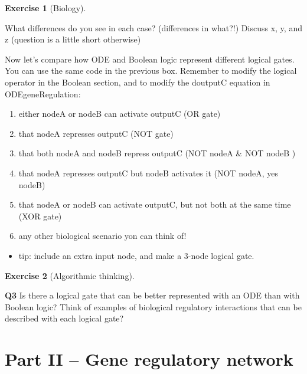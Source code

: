 \documentclass[
  letterpaper,
  DIV=11,
  numbers=noendperiod]{scrreprt}
\providecommand{\tightlist}{%
  \setlength{\itemsep}{0pt}\setlength{\parskip}{0pt}}\usepackage{longtable,booktabs,array}
\theoremstyle{definition}
\newtheorem{exercise}{Exercise}[chapter]
\theoremstyle{remark}
\begin{document}
\begin{exercise}[Biology]\protect\hypertarget{exr-non}{}\label{exr-non}

What differences do you see in each case? (differences in what?!)
Discuss x, y, and z (question is a little short otherwise)

\end{exercise}

Now let's compare how ODE and Boolean logic represent different logical
gates. You can use the same code in the previous box. Remember to modify
the logical operator in the Boolean section, and to modify the doutputC
equation in ODEgeneRegulation:

\begin{enumerate}
\def\labelenumi{\arabic{enumi}.}
\tightlist
\item
  either nodeA or nodeB can activate outputC (OR gate)
\item
  that nodeA represses outputC (NOT gate)
\item
  that both nodeA and nodeB repress outputC (NOT nodeA \& NOT nodeB )
\item
  that nodeA represses outputC but nodeB activates it (NOT nodeA, yes
  nodeB)
\item
  that nodeA or nodeB can activate outputC, but not both at the same
  time (XOR gate)
\item
  any other biological scenario yon can think of!
\end{enumerate}

\begin{itemize}
\tightlist
\item
  tip: include an extra input node, and make a 3-node logical gate.
\end{itemize}

\begin{exercise}[Algorithmic
thinking]\protect\hypertarget{exr-non}{}\label{exr-non}

\textbf{Q3} Is there a logical gate that can be better represented with
an ODE than with Boolean logic? Think of examples of biological
regulatory interactions that can be described with each logical gate?

\end{exercise}

\section{Part II -- Gene regulatory
network}\label{part-ii-gene-regulatory-network}
\end{document}

